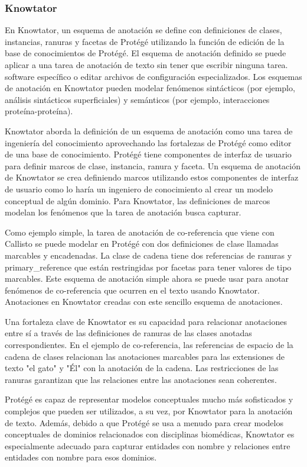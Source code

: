 \subsubsection*{Knowtator}

En Knowtator, un esquema de anotación se define con definiciones de clases, instancias, ranuras y facetas de Protégé utilizando la función de edición de la base de conocimientos de Protégé. El esquema de anotación definido se puede aplicar a una tarea de anotación de texto sin tener que escribir ninguna tarea.
software específico o editar archivos de configuración especializados. Los esquemas de anotación en Knowtator pueden modelar fenómenos sintácticos (por ejemplo, análisis sintácticos superficiales) y semánticos (por ejemplo, interacciones proteína-proteína).

Knowtator aborda la definición de un esquema de anotación como una tarea de ingeniería del conocimiento aprovechando las fortalezas de Protégé como editor de una base de conocimiento. Protégé tiene componentes de interfaz de usuario para definir marcos de clase, instancia, ranura y faceta.
Un esquema de anotación de Knowtator se crea definiendo marcos utilizando estos componentes de interfaz de usuario como lo haría un ingeniero de conocimiento al crear un modelo conceptual de algún dominio. Para Knowtator, las definiciones de marcos modelan los fenómenos que la tarea de anotación busca capturar.

Como ejemplo simple, la tarea de anotación de co-referencia que viene con Callisto se puede modelar en Protégé con dos definiciones de clase llamadas marcables y encadenadas. La clase de cadena tiene dos referencias de ranuras y primary\_reference que están restringidas por facetas para tener valores de tipo marcables. Este esquema de anotación simple ahora se puede usar para anotar fenómenos de co-referencia que ocurren en el texto usando Knowtator. Anotaciones en Knowtator creadas con este sencillo esquema de anotaciones.

Una fortaleza clave de Knowtator es su capacidad para relacionar anotaciones entre sí a través de las definiciones de ranuras de las clases anotadas correspondientes. En el ejemplo de co-referencia, las referencias de espacio de la cadena de clases relacionan las anotaciones marcables para las extensiones de texto "el gato" y "Él" con la anotación de la cadena. Las restricciones de las ranuras garantizan que las relaciones entre las anotaciones sean coherentes.

Protégé es capaz de representar modelos conceptuales mucho más sofisticados y complejos que pueden ser utilizados, a su vez, por Knowtator para la anotación de texto. Además, debido a que Protégé se usa a menudo para crear modelos conceptuales de dominios relacionados con disciplinas biomédicas, Knowtator es especialmente adecuado para capturar entidades con nombre y relaciones entre entidades con nombre para esos dominios.

